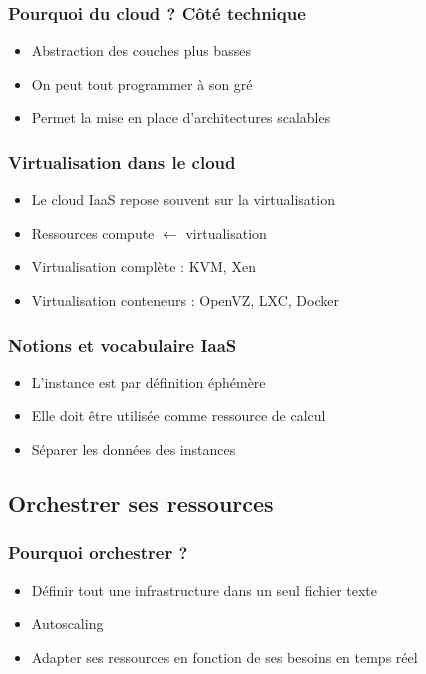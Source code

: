   \begin{frame}
    \frametitle{Pourquoi du cloud ? Côté technique}
    \begin{itemize}
      \item Abstraction des couches plus basses
      \item On peut tout programmer à son gré
      \item Permet la mise en place d'architectures scalables
    \end{itemize}
  \end{frame}

  \begin{frame}
    \frametitle{Virtualisation dans le cloud}
    \begin{itemize}
      \item Le cloud IaaS repose souvent sur la virtualisation
      \item Ressources compute $\leftarrow$ virtualisation
      \item Virtualisation complète : KVM, Xen
      \item Virtualisation conteneurs : OpenVZ, LXC, Docker
    \end{itemize}
  \end{frame}

  \begin{frame}
    \frametitle{Notions et vocabulaire IaaS}
    \begin{itemize}
      \item L'instance est par définition éphémère
      \item Elle doit être utilisée comme ressource de calcul
      \item Séparer les données des instances
    \end{itemize}
  \end{frame}

\subsection[Orchestration]{Orchestrer ses ressources}

  \begin{frame}
    \frametitle{Pourquoi orchestrer ?}
    \begin{itemize}
      \item Définir tout une infrastructure dans un seul fichier texte
      \item Autoscaling
      \item Adapter ses ressources en fonction de ses besoins en temps réel
    \end{itemize}
  \end{frame}

